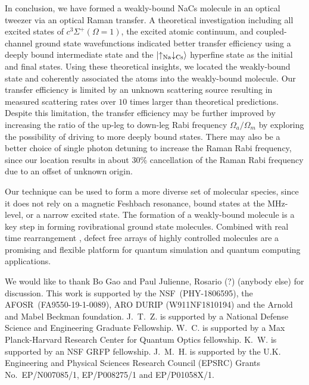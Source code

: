 \documentclass[aps,prl,twocolumn,superscriptaddress]{revtex4-1}
\newcommand{\Na}{\mathrm{Na}}
\newcommand{\Cs}{\mathrm{Cs}}
\newcommand{\todo}[1]{}
\begin{document}
In conclusion, we have formed a weakly-bound NaCs molecule in an optical tweezer
via an optical Raman transfer.
A theoretical investigation including all excited states of $ c^3\Sigma^+(\Omega = 1)$,
the excited atomic continuum, and coupled-channel ground state wavefunctions indicated
better transfer efficiency using a deeply bound intermediate state
and the $\ket{\uparrow_{\Na} \downarrow_{\Cs} }$ hyperfine state as the initial and final states.
Using these theoretical insights, we located the weakly-bound state
and coherently associated the atoms into the weakly-bound molecule.
Our transfer efficiency is limited by an unknown scattering source
resulting in measured scattering rates over $10$ times larger than theoretical predictions.
Despite this limitation, the transfer efficiency may be further improved
by increasing the ratio of the up-leg to down-leg Rabi frequency
$\Omega_a/\Omega_m$ by exploring the possibility of
driving to more deeply bound states.
There may also be a better choice of single photon detuning to increase the Raman Rabi frequency,
since our location results in about 30\% cancellation of the Raman Rabi frequency
due to an offset of unknown origin.

Our technique can be used to form a more diverse set of molecular species,
since it does not rely on a magnetic Feshbach resonance, bound states at the MHz-level,
or a narrow excited state. The formation of a weakly-bound molecule is a key step
in forming rovibrational ground state molecules.
Combined with real time rearrangement \cite{Barredo2016, Endres2016},
defect free arrays of highly controlled molecules are a promising
and flexible platform for quantum simulation and quantum computing applications.

\todo{sm: STIRAP vs Raman}

\begin{acknowledgments}
  We would like to thank Bo Gao and Paul Julienne, Rosario (?) (anybody else) for discussion. This work is supported by the NSF~(PHY-1806595), the AFOSR~(FA9550-19-1-0089), ARO DURIP (W911NF1810194) and the Arnold and Mabel Beckman foundation. J.~T.~Z. is supported by a National Defense Science and Engineering Graduate Fellowship. W.~C. is supported by a Max Planck-Harvard Research Center for Quantum Optics fellowship. K.~W. is supported by an NSF GRFP fellowship. J.~M.~H. is supported by the U.K. Engineering and Physical Sciences Research Council (EPSRC) Grants No.\ EP/N007085/1, EP/P008275/1 and EP/P01058X/1.
\end{acknowledgments}



\end{document}
